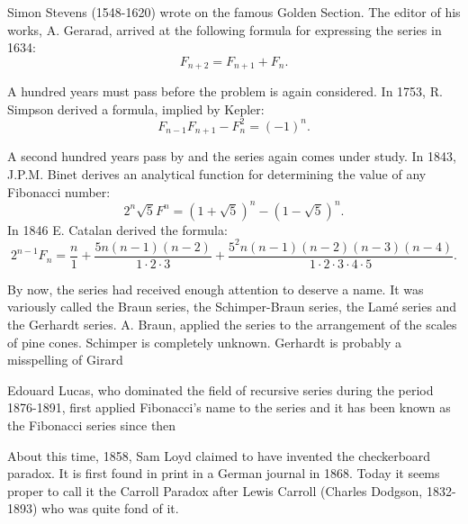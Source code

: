 \documentclass[10pt,]{book}
\theoremstyle{plain}
\theoremstyle{definition}
\theoremstyle{definition}
\numberwithin{equation}{chapter}
\begin{document}
\par
\hypertarget{p-12}{}%
Simon Stevens (1548-1620) wrote on the famous Golden Section.  The editor of his works, A. Gerarad, arrived at the following formula for expressing the series in 1634:%
\begin{equation*}
F_{n + 2} = F_{n + 1} + F_{n}.
\end{equation*}
%
\par
\hypertarget{p-13}{}%
A hundred years must pass before the problem is again considered. In 1753, R. Simpson derived a formula, implied by Kepler:%
\begin{equation*}
F_{n - 1}F_{n + 1} - F_{n}^{2} = \left( - 1 \right)^{n}.
\end{equation*}
%
\par
\hypertarget{p-14}{}%
A second hundred years pass by and the series again comes under study. In 1843, J.P.M. Binet derives an analytical function for determining the value of any Fibonacci number:%
\begin{equation*}
2^n \sqrt{5} F^n = (1 + \sqrt{5})^{n} - (1 - \sqrt{5})^{n}.
\end{equation*}
In 1846 E. Catalan derived the formula:%
\begin{equation*}
2^{n - 1}F_{n} = \frac{n}{1} + \frac{5n\left( n - 1 \right)\left( n - 2 \right)}{1 \cdot 2 \cdot 3} + \frac{5^{2}n\left( n - 1 \right)\left( n - 2 \right)\left( n - 3 \right)\left( n - 4 \right)}{1 \cdot 2 \cdot 3 \cdot 4 \cdot 5}.
\end{equation*}
%
\par
\hypertarget{p-15}{}%
By now, the series had received enough attention to deserve a name. It was variously called the Braun series, the Schimper-Braun series, the Lamé series and the Gerhardt series. A. Braun, applied the series to the arrangement of the scales of pine cones. Schimper is completely unknown. Gerhardt is probably a misspelling of Girard%
\par
\hypertarget{p-16}{}%
Edouard Lucas, who dominated the field of recursive series during the period 1876-1891, first applied Fibonacci's name to the series and it has been known as the Fibonacci series since then%
\par
\hypertarget{p-17}{}%
About this time, 1858, Sam Loyd claimed to have invented the checkerboard paradox. It is first found in print in a German journal in 1868. Today it seems proper to call it the Carroll Paradox after Lewis Carroll (Charles Dodgson, 1832-1893) who was quite fond of it.%
\typeout{************************************************}
\typeout{************************************************}
\end{document}
